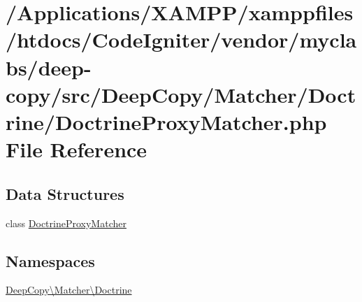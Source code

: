 \hypertarget{_doctrine_proxy_matcher_8php}{}\section{/\+Applications/\+X\+A\+M\+P\+P/xamppfiles/htdocs/\+Code\+Igniter/vendor/myclabs/deep-\/copy/src/\+Deep\+Copy/\+Matcher/\+Doctrine/\+Doctrine\+Proxy\+Matcher.php File Reference}
\label{_doctrine_proxy_matcher_8php}
\subsection*{Data Structures}
\begin{DoxyCompactItemize}
\item 
class \mbox{\hyperlink{class_deep_copy_1_1_matcher_1_1_doctrine_1_1_doctrine_proxy_matcher}{Doctrine\+Proxy\+Matcher}}
\end{DoxyCompactItemize}
\subsection*{Namespaces}
\begin{DoxyCompactItemize}
\item 
 \mbox{\hyperlink{namespace_deep_copy_1_1_matcher_1_1_doctrine}{Deep\+Copy\textbackslash{}\+Matcher\textbackslash{}\+Doctrine}}
\end{DoxyCompactItemize}

